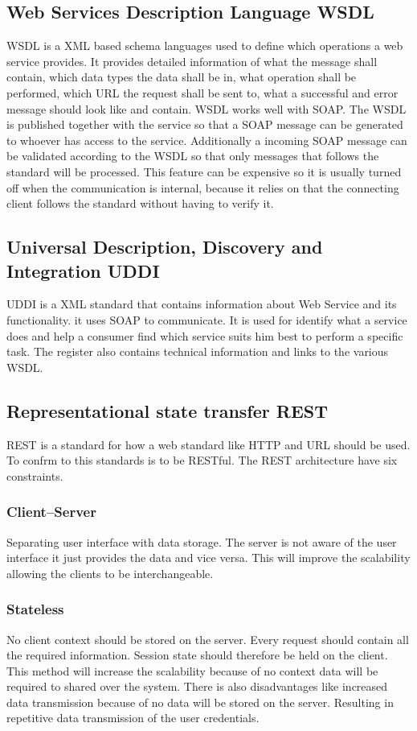 \documentclass{llncs}
\begin{document}
\subsection{Web Services Description Language WSDL}
WSDL is a XML based schema languages used to define which operations a web service provides. It provides detailed information of what the message shall contain, which data types the data shall be in, what operation shall be performed, which URL the request shall be sent to, what a successful and error message should look like and contain. WSDL works well with SOAP. The WSDL is published together with the service so that a SOAP message can be generated to whoever has access to the service. Additionally a incoming SOAP message can be validated according to the WSDL so that only messages that follows the standard will be processed. This feature can be expensive so it is usually turned off when the communication is internal, because it relies on that the connecting client follows the standard without having to verify it.

\subsection{Universal Description, Discovery and Integration UDDI}
UDDI is a XML standard that contains information about Web Service and its functionality. it uses SOAP to communicate. It is used for identify what a service does and help a consumer find which service suits him best to perform a specific task. The register also contains technical information and links to the various WSDL.

\subsection{Representational state transfer REST}
REST is a standard for how a web standard like HTTP and URL should be used. To confrm to this standards is to be RESTful. The REST architecture have six constraints.

\subsubsection{Client–Server}
Separating user interface with data storage. The server is not aware of the user interface it just provides the data and vice versa. This will improve the scalability allowing the clients to be interchangeable.

\subsubsection{Stateless}
No client context should be stored on the server. Every request should contain all the required information. Session state should therefore be held on the client. This method will increase the scalability because of no context data will be required to shared over the system. There is also disadvantages like increased data transmission because of no data will be stored on the server. Resulting in repetitive data transmission of the user credentials.
\end{document}
